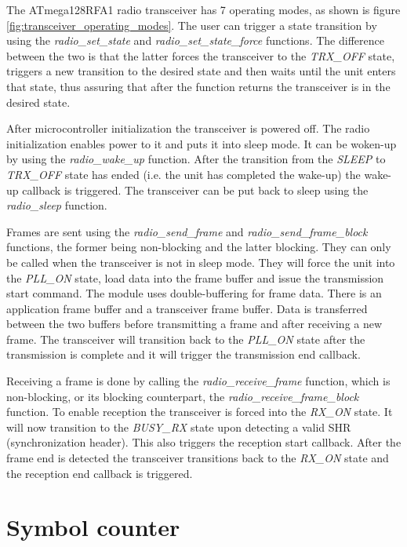 The \mbox{ATmega128RFA1} radio transceiver has 7 operating modes, as shown is
figure \ref{fig:transceiver_operating_modes}. The user can trigger a state
transition by using the \emph{radio\_set\_state} and
\emph{radio\_set\_state\_force} functions. The difference between the two is
that the latter forces the transceiver to the \emph{TRX\_OFF} state, triggers a
new transition to the desired state and then waits until the unit enters that
state, thus assuring that after the function returns the transceiver is in the
desired state.

After microcontroller initialization the transceiver is powered off. The radio
initialization enables power to it and puts it into sleep mode. It can be
woken-up by using the \emph{radio\_wake\_up} function. After the transition
from the \emph{SLEEP} to \emph{TRX\_OFF} state has ended (i.e. the unit has
completed the wake-up) the wake-up callback is triggered. The transceiver can
be put back to sleep using the \emph{radio\_sleep} function.

Frames are sent using the \emph{radio\_send\_frame} and
\emph{radio\_send\_frame\_block} functions, the former being non-blocking and
the latter blocking. They can only be called when the transceiver is not in
sleep mode. They will force the unit into the \emph{PLL\_ON} state, load data
into the frame buffer and issue the transmission start command. The module uses
double-buffering for frame data. There is an application frame buffer and a
transceiver frame buffer. Data is transferred between the two buffers before
transmitting a frame and after receiving a new frame. The transceiver will
transition back to the \emph{PLL\_ON} state after the transmission is complete
and it will trigger the transmission end callback.

Receiving a frame is done by calling the \emph{radio\_receive\_frame} function,
which is non-blocking, or its blocking counterpart,
the \emph{radio\_receive\_frame\_block} function. To enable reception the
transceiver is forced into the \emph{RX\_ON} state. It will now transition to
the \emph{BUSY\_RX} state upon detecting a valid SHR (synchronization header).
This also triggers the reception start callback. After the frame end is
detected the transceiver transitions back to the \emph{RX\_ON} state and the
reception end callback is triggered.

\section{Symbol counter}

